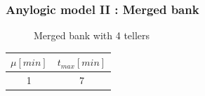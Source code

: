 \documentclass[10pt]{beamer}
\begin{document}
\begin{frame}
  \frametitle{Anylogic model II : Merged bank}
  \begin{figure}
  \centering
{}

\caption{Merged bank with 4 tellers}
\end{figure}
  
  
\begin{table}
\centering
\begin{tabular}{|c|c|}
\hline
$\mu[min]$ & $t_{max}[min]$ \\
\hline
1 & 7 \\
\hline
\end{tabular} 
\end{table}

\end{frame}
\end{document}
